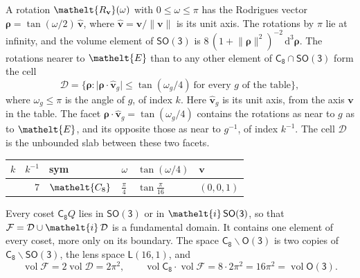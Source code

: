\documentclass[10pt,a4paper]{article}
\numberwithin{equation}{section}
\newcommand{\eltfont}[1]{{\let\sigma\eltsigma\mathelt{#1}}}
\newcommand{\grp}[1]{\mathsf{#1}}
\newcommand{\cls}[1]{\eltfont{#1}}
\newcommand{\elt}[1]{\eltfont{#1}}
\newcommand{\dirvec}[3]{(#1, #2, #3)}
\newcommand{\unitaxis}{\hat{\mathbf{v}}}
\newcommand{\vv}{\mathbf{v}}
\newcommand{\diff}{\mathrm{d}}
\newcommand{\vol}{\operatorname{vol}}
\newcommand{\rodrigues}{\boldsymbol{\rho}}
\newcommand{\fcell}{\mathcal{D}}
\newcommand{\fdomain}{\mathcal{F}}
\newcommand{\lensspace}[2]{\mathsf{L}(#1, #2)}
\begin{document}
\leavevmode\label{n:vector.rodrigues}\label{n:vector.unitaxis}A rotation $\elt{R_{\vv}}(\omega)$ with $0 \le \omega \le \pi$ has the Rodrigues vector $\rodrigues = \tan(\omega/2)\,\unitaxis$, where $\unitaxis = \vv/\lVert\vv\rVert$ is its unit axis. The rotations by $\pi$ lie at infinity, and the volume element of \href{SO3.pdf}{$\grp{SO(3)}$} is $8\,(1 + \lVert\rodrigues\rVert^2)^{-2}\,\diff^3\rodrigues$.
\leavevmode\label{n:set.cell}The rotations nearer to $\elt{E}$ than to any other element of $\grp{C_{8}} \cap \grp{SO(3)}$ form the cell
\begin{equation}\label{e:cell}\fcell = \bigl\{\rodrigues : \lvert\rodrigues\cdot\unitaxis_g\rvert \le \tan(\omega_g/4)\ \text{for every $g$ of the table}\bigr\},\end{equation}
where $\omega_g \le \pi$ is the angle of $g$, of index $k$. Here $\unitaxis_g$ is its unit axis, from the axis $\vv$ in the table. The facet $\rodrigues\cdot\unitaxis_g = \tan(\omega_g/4)$ contains the rotations as near to $g$ as to $\elt{E}$, and its opposite those as near to $g^{-1}$, of index $k^{-1}$. The cell $\fcell$ is the unbounded slab between these two facets.
{\small{\renewcommand{\arraystretch}{1.3}\begin{longtable}{@{}rrllll@{}}\toprule
$k$ & $k^{-1}$ & sym & $\omega$ & $\tan(\omega/4)$ & $\vv$\\\midrule\endhead
\bottomrule\endfoot\endlastfoot
1 & 7 & $\cls{C_{8}}$ & $\tfrac{\pi}{4}$ & $\tan\tfrac{\pi}{16}$ & $\dirvec{0}{0}{1}$\\
\bottomrule\end{longtable}}}

\leavevmode\label{n:set.fundamental}Every coset $\grp{C_{8}}Q$ lies in \href{SO3.pdf}{$\grp{SO(3)}$} or in $\elt{i}\,\grp{SO(3)}$, so that $\fdomain = \fcell \cup \elt{i}\,\fcell$ is a fundamental domain. It contains one element of every coset, more only on its boundary.
\leavevmode\label{n:set.lens}The space $\grp{C_{8}}\backslash\grp{O(3)}$ is two copies of $\grp{C_{8}}\backslash\grp{SO(3)}$, the lens space $\lensspace{16}{1}$, and
\begin{equation}\label{e:volume}\vol\fdomain = 2\vol\fcell = 2\pi^2,\qquad \vol\grp{C_{8}}\cdot\vol\fdomain = 8\cdot 2\pi^2 = 16\pi^2 = \vol\grp{O(3)}.\end{equation}
\end{document}
